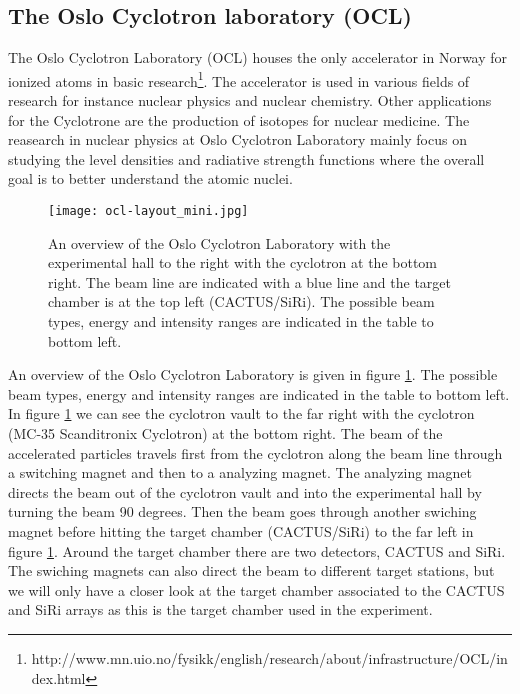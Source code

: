 \documentclass[11pt,a4wide]{article}
\begin{document}
\subsection{The Oslo Cyclotron laboratory (OCL)}
The Oslo Cyclotron Laboratory (OCL) houses the only accelerator in Norway for ionized atoms in basic research\footnote{http://www.mn.uio.no/fysikk/english/research/about/infrastructure/OCL/index.html}. The accelerator is used in various fields of research for instance nuclear physics and nuclear chemistry. Other applications for the Cyclotrone are the production of isotopes for nuclear medicine. The reasearch in nuclear physics at Oslo Cyclotron Laboratory mainly focus on studying the level densities and radiative strength functions where the overall goal is to better understand the atomic nuclei. 

\begin{figure}[htp]
\centering
\texttt{[image: ocl-layout\_mini.jpg]}
\caption{An overview of the Oslo Cyclotron Laboratory with the experimental hall to the right with the cyclotron at the bottom right. The beam line are indicated with a blue line and the target chamber is at the top left (CACTUS/SiRi). The possible beam types, energy and intensity ranges are indicated in the table to bottom left. }
\label{fig:OLC_exp_hall}
\end{figure}

An overview of the Oslo Cyclotron Laboratory is given in figure \ref{fig:OLC_exp_hall}. The possible beam types, energy and intensity ranges are indicated in the table to bottom left. In figure \ref{fig:OLC_exp_hall} we can see the cyclotron vault to the far right with the cyclotron (MC-35 Scanditronix Cyclotron) at the bottom right. The beam of the accelerated particles travels first from the cyclotron along the beam line through a switching magnet and then to a analyzing magnet. The analyzing magnet directs the beam out of the cyclotron vault and into the experimental hall by turning the beam 90 degrees. Then the beam goes through another swiching magnet before hitting the target chamber (CACTUS/SiRi) to the far left in figure \ref{fig:OLC_exp_hall}. Around the target chamber there are two detectors, CACTUS and SiRi. The swiching magnets can also direct the beam to different target stations, but we will only have a closer look at the target chamber associated to the CACTUS and SiRi arrays as this is the target chamber used in the experiment. 
\end{document}
